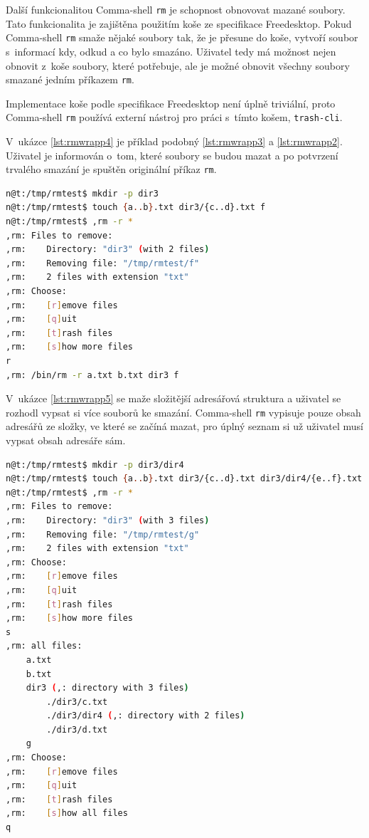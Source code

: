 \documentclass[thesis=M,czech]{FITthesis}[2012/06/26]
\begin{document}
Další funkcionalitou Comma-shell \texttt{rm} je schopnost obnovovat mazané soubory. Tato funkcionalita je zajištěna použitím koše ze specifikace Freedesktop. Pokud Comma-shell \texttt{rm} smaže nějaké soubory tak, že je přesune do koše, vytvoří soubor s~informací kdy, odkud a co bylo smazáno. Uživatel tedy má možnost nejen obnovit z~koše soubory, které potřebuje, ale je možné obnovit všechny soubory smazané jedním příkazem \texttt{rm}.

Implementace koše podle specifikace Freedesktop není úplně triviální, proto Comma-shell \texttt{rm} používá externí nástroj pro práci s~tímto košem, \texttt{trash-cli}.


V~ukázce \ref{lst:rmwrapp4} je příklad podobný \ref{lst:rmwrapp3} a \ref{lst:rmwrapp2}. Uživatel je informován o~tom, které soubory se budou mazat a po potvrzení trvalého smazání je spuštěn originální příkaz \texttt{rm}.

\noindent
\begin{minipage}{\linewidth}
\begin{lstlisting}[language=bash, caption={rm s~}, label={lst:rmwrapp4}]
n@t:/tmp/rmtest$ mkdir -p dir3
n@t:/tmp/rmtest$ touch {a..b}.txt dir3/{c..d}.txt f
n@t:/tmp/rmtest$ ,rm -r *
,rm: Files to remove:
,rm:    Directory: "dir3" (with 2 files)
,rm:    Removing file: "/tmp/rmtest/f"
,rm:    2 files with extension "txt"
,rm: Choose:
,rm:    [r]emove files
,rm:    [q]uit
,rm:    [t]rash files
,rm:    [s]how more files
r
,rm: /bin/rm -r a.txt b.txt dir3 f
\end{lstlisting}
\end{minipage}


V~ukázce \ref{lst:rmwrapp5} se maže složitější adresářová struktura a uživatel se rozhodl vypsat si více souborů ke smazání. Comma-shell \texttt{rm} vypisuje pouze obsah adresářů ze složky, ve které se začíná mazat, pro úplný seznam si už uživatel musí vypsat obsah adresáře sám.

\noindent
\begin{minipage}{\linewidth}
\begin{lstlisting}[language=bash, caption={rm s~}, label={lst:rmwrapp5}]
n@t:/tmp/rmtest$ mkdir -p dir3/dir4
n@t:/tmp/rmtest$ touch {a..b}.txt dir3/{c..d}.txt dir3/dir4/{e..f}.txt g
n@t:/tmp/rmtest$ ,rm -r *
,rm: Files to remove:
,rm:    Directory: "dir3" (with 3 files)
,rm:    Removing file: "/tmp/rmtest/g"
,rm:    2 files with extension "txt"
,rm: Choose:
,rm:    [r]emove files
,rm:    [q]uit
,rm:    [t]rash files
,rm:    [s]how more files
s
,rm: all files:
    a.txt
    b.txt
    dir3 (,: directory with 3 files)
        ./dir3/c.txt
        ./dir3/dir4 (,: directory with 2 files)
        ./dir3/d.txt
    g
,rm: Choose:
,rm:    [r]emove files
,rm:    [q]uit
,rm:    [t]rash files
,rm:    [s]how all files
q
\end{lstlisting}
\end{minipage}
\end{document}
